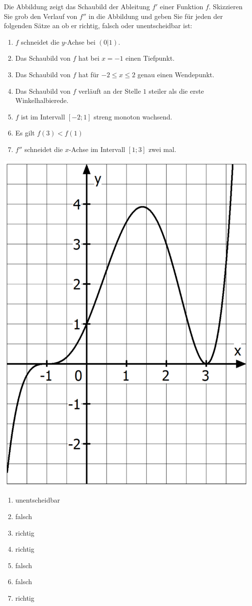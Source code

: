 \aufgabe{}
\begin{multicols}{2}
	Die Abbildung zeigt das Schaubild der Ableitung $f'$ einer Funktion $f$. Skizzieren Sie grob den Verlauf von $f''$ in die Abbildung und geben Sie für jeden der folgenden Sätze an ob er richtig, falsch oder unentscheidbar ist:
	\begin{enumerate}
		\item $f$ schneidet die $y$-Achse bei $(0|1)$.
		\item Das Schaubild von $f$ hat bei $x=-1$ einen Tiefpunkt.
		\item Das Schaubild von $f$ hat für $-2\leq x \leq 2$ genau einen Wendepunkt.
		\item Das Schaubild von $f$ verläuft an der Stelle $1$ steiler als die erste Winkelhalbierede.
		\item $f$ ist im Intervall $[-2;1]$ streng monoton wachsend.
		\item Es gilt $f(3)<f(1)$
		\item $f''$ schneidet die $x$-Achse im Intervall $[1;3]$ zwei mal.
	\end{enumerate}
	\columnbreak
	\centering
	\includegraphics[width=0.7\linewidth]{Monotonieanalyse.png}

\end{multicols}
\begin{lsg}{}
	\begin{multicols}{4}
		\begin{enumerate}
			\item unentscheidbar
			\item falsch
			\item richtig
			\item richtig
			\item falsch
			\item falsch
			\item richtig
		\end{enumerate}
	\end{multicols}
\end{lsg}

